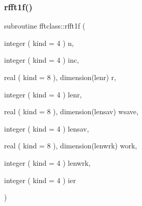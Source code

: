 \subsubsection{\texorpdfstring{rfft1f()}{rfft1f()}}
{\footnotesize\ttfamily subroutine fftclass\+::rfft1f (\begin{DoxyParamCaption}\item[{integer ( kind = 4 )}]{n,  }\item[{integer ( kind = 4 )}]{inc,  }\item[{real ( kind = 8 ), dimension(lenr)}]{r,  }\item[{integer ( kind = 4 )}]{lenr,  }\item[{real ( kind = 8 ), dimension(lensav)}]{wsave,  }\item[{integer ( kind = 4 )}]{lensav,  }\item[{real ( kind = 8 ), dimension(lenwrk)}]{work,  }\item[{integer ( kind = 4 )}]{lenwrk,  }\item[{integer ( kind = 4 )}]{ier }\end{DoxyParamCaption})}

